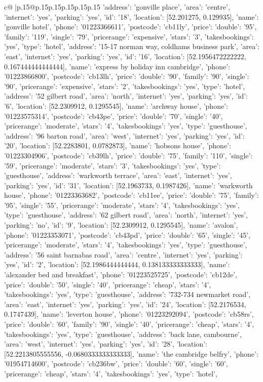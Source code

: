 \documentclass{article}
\begin{document}
{\begin{supertabular}{c@{$\;$}|p{.15\linewidth}@{}p{.15\linewidth}p{.15\linewidth}p{.15\linewidth}p{.15\linewidth}p{.15\linewidth}}
{{{{'address': 'gonville place', 'area': 'centre', 'internet': 'yes', 'parking': 'yes', 'id': '18', 'location': [52.201275, 0.129935], 'name': 'gonville hotel', 'phone': '01223366611', 'postcode': 'cb11ly', 'price': {'double': '95', 'family': '119', 'single': '79'}, 'pricerange': 'expensive', 'stars': '3', 'takesbookings': 'yes', 'type': 'hotel'}, {'address': '15-17 norman way, coldhams business park', 'area': 'east', 'internet': 'yes', 'parking': 'yes', 'id': '16', 'location': [52.1956472222222, 0.167444444444444], 'name': 'express by holiday inn cambridge', 'phone': '01223866800', 'postcode': 'cb13lh', 'price': {'double': '90', 'family': '90', 'single': '90'}, 'pricerange': 'expensive', 'stars': '2', 'takesbookings': 'yes', 'type': 'hotel'}, {'address': '52 gilbert road', 'area': 'north', 'internet': 'yes', 'parking': 'yes', 'id': '6', 'location': [52.2309912, 0.1295545], 'name': 'archway house', 'phone': '01223575314', 'postcode': 'cb43pe', 'price': {'double': '70', 'single': '40'}, 'pricerange': 'moderate', 'stars': '4', 'takesbookings': 'yes', 'type': 'guesthouse'}, {'address': '96 barton road', 'area': 'west', 'internet': 'yes', 'parking': 'yes', 'id': '20', 'location': [52.2283801, 0.0782873], 'name': 'hobsons house', 'phone': '01223304906', 'postcode': 'cb39lh', 'price': {'double': '75', 'family': '110', 'single': '59'}, 'pricerange': 'moderate', 'stars': '3', 'takesbookings': 'yes', 'type': 'guesthouse'}, {'address': 'warkworth terrace', 'area': 'east', 'internet': 'yes', 'parking': 'yes', 'id': '31', 'location': [52.1963733, 0.1987426], 'name': 'warkworth house', 'phone': '01223363682', 'postcode': 'cb11ee', 'price': {'double': '75', 'family': '95', 'single': '55'}, 'pricerange': 'moderate', 'stars': '4', 'takesbookings': 'yes', 'type': 'guesthouse'}, {'address': '62 gilbert road', 'area': 'north', 'internet': 'yes', 'parking': 'no', 'id': '9', 'location': [52.2309912, 0.1295545], 'name': 'avalon', 'phone': '01223353071', 'postcode': 'cb43pd', 'price': {'double': '65', 'single': '45'}, 'pricerange': 'moderate', 'stars': '4', 'takesbookings': 'yes', 'type': 'guesthouse'}, {'address': '56 saint barnabas road', 'area': 'centre', 'internet': 'yes', 'parking': 'yes', 'id': '2', 'location': [52.1986444444444, 0.138133333333333], 'name': 'alexander bed and breakfast', 'phone': '01223525725', 'postcode': 'cb12de', 'price': {'double': '50', 'single': '40'}, 'pricerange': 'cheap', 'stars': '4', 'takesbookings': 'yes', 'type': 'guesthouse'}, {'address': '732-734 newmarket road', 'area': 'east', 'internet': 'yes', 'parking': 'yes', 'id': '24', 'location': [52.2176534, 0.1747439], 'name': 'leverton house', 'phone': '01223292094', 'postcode': 'cb58rs', 'price': {'double': '60', 'family': '90', 'single': '40'}, 'pricerange': 'cheap', 'stars': '4', 'takesbookings': 'yes', 'type': 'guesthouse'}, {'address': 'back lane, cambourne', 'area': 'west', 'internet': 'yes', 'parking': 'yes', 'id': '28', 'location': [52.2213805555556, -0.0680333333333333], 'name': 'the cambridge belfry', 'phone': '01954714600', 'postcode': 'cb236bw', 'price': {'double': '60', 'single': '60'}, 'pricerange': 'cheap', 'stars': '4', 'takesbookings': 'yes', 'type': 'hotel'}, }}}
\end{supertabular}}
\end{document}
